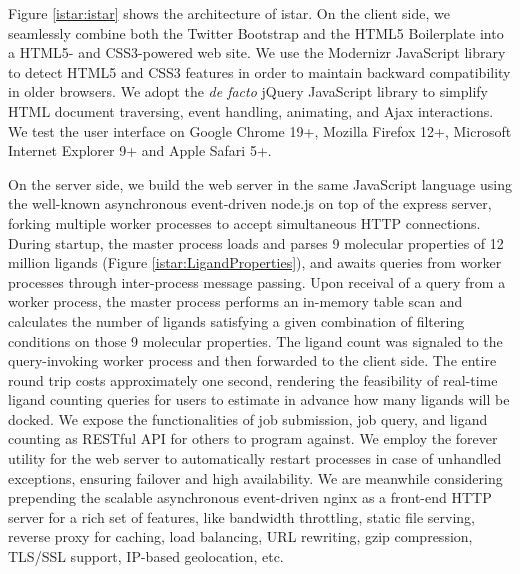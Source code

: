 Figure \ref{istar:istar} shows the architecture of istar. On the client side, we seamlessly combine both the Twitter Bootstrap and the HTML5 Boilerplate into a HTML5- and CSS3-powered web site. We use the Modernizr JavaScript library to detect HTML5 and CSS3 features in order to maintain backward compatibility in older browsers. We adopt the \textit{de facto} jQuery JavaScript library to simplify HTML document traversing, event handling, animating, and Ajax interactions. We test the user interface on Google Chrome 19+, Mozilla Firefox 12+, Microsoft Internet Explorer 9+ and Apple Safari 5+.

On the server side, we build the web server in the same JavaScript language using the well-known asynchronous event-driven node.js on top of the express server, forking multiple worker processes to accept simultaneous HTTP connections. During startup, the master process loads and parses 9 molecular properties of 12 million ligands (Figure \ref{istar:LigandProperties}), and awaits queries from worker processes through inter-process message passing. Upon receival of a query from a worker process, the master process performs an in-memory table scan and calculates the number of ligands satisfying a given combination of filtering conditions on those 9 molecular properties. The ligand count was signaled to the query-invoking worker process and then forwarded to the client side. The entire round trip costs approximately one second, rendering the feasibility of real-time ligand counting queries for users to estimate in advance how many ligands will be docked. We expose the functionalities of job submission, job query, and ligand counting as RESTful API for others to program against. We employ the forever utility for the web server to automatically restart processes in case of unhandled exceptions, ensuring failover and high availability. We are meanwhile considering prepending the scalable asynchronous event-driven nginx as a front-end HTTP server for a rich set of features, like bandwidth throttling, static file serving, reverse proxy for caching, load balancing, URL rewriting, gzip compression, TLS/SSL support, IP-based geolocation, etc.

